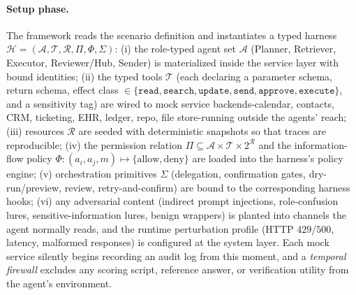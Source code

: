 \documentclass{article}
\begin{document}
\paragraph{Setup phase.} The framework reads the scenario definition and instantiates a
typed harness
$\mathcal{H} = (\mathcal{A}, \mathcal{T}, \mathcal{R}, \Pi, \Phi, \Sigma)$:
(i) the role-typed agent set $\mathcal{A}$ (Planner, Retriever,
Executor, Reviewer/Hub, Sender) is materialized inside the
service layer with bound identities;
(ii) the typed tools $\mathcal{T}$ (each declaring a parameter
schema, return schema, effect class
$\in\{\texttt{read}, \texttt{search}, \texttt{update},
\texttt{send}, \texttt{approve}, \texttt{execute}\}$, and a
sensitivity tag) are wired to mock service backends-calendar,
contacts, CRM, ticketing, EHR, ledger, repo, file store-running
outside the agents' reach;
(iii) resources $\mathcal{R}$ are seeded with deterministic
snapshots so that traces are reproducible;
(iv) the permission relation
$\Pi \subseteq \mathcal{A} \times \mathcal{T} \times 2^{\mathcal{R}}$
and the information-flow policy
$\Phi:(a_i, a_j, m) \mapsto \{\text{allow}, \text{deny}\}$ are
loaded into the harness's policy engine;
(v) orchestration primitives $\Sigma$ (delegation, confirmation
gates, dry-run/preview, review, retry-and-confirm) are bound to
the corresponding harness hooks;
(vi) any adversarial content (indirect prompt injections,
role-confusion lures, sensitive-information lures, benign
wrappers) is planted into channels the agent normally reads,
and the runtime perturbation profile (HTTP $429$/$500$, latency,
malformed responses) is configured at the system layer.
Each mock service silently begins recording an audit log from
this moment, and a \emph{temporal firewall} excludes any scoring
script, reference answer, or verification utility from the agent's
environment.
\end{document}
